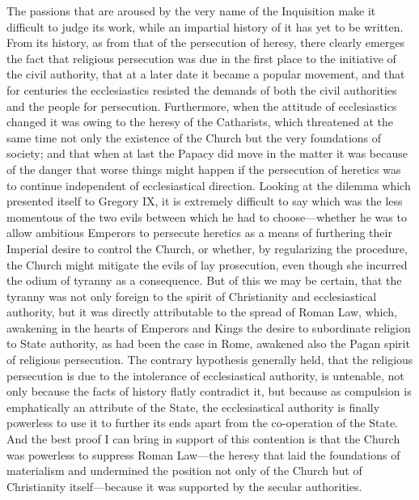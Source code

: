 \documentclass{book}
\begin{document}
The passions that are aroused by the very name of the Inquisition make it difficult to judge its work, while an impartial history of it has yet to be written. From its history, as from that of the persecution of heresy, there clearly emerges the fact that religious persecution was due in the first place to the initiative of the civil authority, that at a later date it became a popular movement, and that for centuries the ecclesiastics resisted the demands of both the civil authorities and the people for persecution. Furthermore, when the attitude of ecclesiastics changed it was owing to the heresy of the Catharists, which threatened at the same time not only the existence of the Church but the very foundations of society; and that when at last the Papacy did move in the matter it was because of the danger that worse things might happen if the persecution of heretics was to continue independent of ecclesiastical direction. Looking at the dilemma which presented itself to Gregory IX, it is extremely difficult to say which was the less momentous of the two evils between which he had to choose—whether he was to allow ambitious Emperors to persecute heretics as a means of furthering their Imperial desire to control the Church, or whether, by regularizing the procedure, the Church might mitigate the evils of lay prosecution, even though she incurred the odium of tyranny as a consequence. But of this we may be certain, that the tyranny was not only foreign to the spirit of Christianity and ecclesiastical authority, but it was directly attributable to the spread of Roman Law, which, awakening in the hearts of Emperors and Kings the desire to subordinate religion to State authority, as had been the case in Rome, awakened also the Pagan spirit of religious persecution. The contrary hypothesis generally held, that the religious persecution is due to the intolerance of ecclesiastical authority, is untenable, not only because the facts of history flatly contradict it, but because as compulsion is emphatically an attribute of the State, the ecclesiastical authority is finally powerless to use it to further its ends apart from the co-operation of the State. And the best proof I can bring in support of this contention is that the Church was powerless to suppress Roman Law—the heresy that laid the foundations of materialism and undermined the position not only of the Church but of Christianity itself—because it was supported by the secular authorities.
\end{document}
